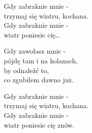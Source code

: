 \begin{text}
    Gdy zabraknie mnie -\\
    trzymaj się wiatru, kochana.\\
    Gdy zabraknie mnie -\\
    wiatr poniesie cię…

    Gdy zawołasz mnie -\\
    pójdę tam i na kolanach,\\
    by odnaleźć to,\\
    co zgubiłem dawno już.

    Gdy zabraknie mnie -\\
    trzymaj się wiatru, kochana.\\
    Gdy zabraknie mnie -\\
    wiatr poniesie cię znów.
\end{text}
\begin{chord}

\end{chord}